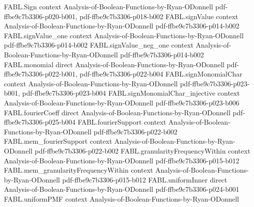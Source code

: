 \begin{theorem}
\label{FABL.FiniteFourierBasis.projectOnCoordinates_fourier_expansion}
\leanok
{}
\proofstep
  {FABL.Sign}
  {context}
  {Analysis-of-Boolean-Functions-by-Ryan-ODonnell}
  {pdf-ffbe9c7b3306-p020-b001,
    pdf-ffbe9c7b3306-p018-b002}
\proofstep
  {FABL.signValue}
  {context}
  {Analysis-of-Boolean-Functions-by-Ryan-ODonnell}
  {pdf-ffbe9c7b3306-p014-b002}
\proofstep
  {FABL.signValue_one}
  {context}
  {Analysis-of-Boolean-Functions-by-Ryan-ODonnell}
  {pdf-ffbe9c7b3306-p014-b002}
\proofstep
  {FABL.signValue_neg_one}
  {context}
  {Analysis-of-Boolean-Functions-by-Ryan-ODonnell}
  {pdf-ffbe9c7b3306-p014-b002}
\proofstep
  {FABL.monomial}
  {direct}
  {Analysis-of-Boolean-Functions-by-Ryan-ODonnell}
  {pdf-ffbe9c7b3306-p022-b001,
    pdf-ffbe9c7b3306-p022-b004}
\proofstep
  {FABL.signMonomialChar}
  {context}
  {Analysis-of-Boolean-Functions-by-Ryan-ODonnell}
  {pdf-ffbe9c7b3306-p023-b001,
    pdf-ffbe9c7b3306-p023-b004}
\proofstep
  {FABL.signMonomialChar_injective}
  {context}
  {Analysis-of-Boolean-Functions-by-Ryan-ODonnell}
  {pdf-ffbe9c7b3306-p023-b006}
\proofstep
  {FABL.fourierCoeff}
  {direct}
  {Analysis-of-Boolean-Functions-by-Ryan-ODonnell}
  {pdf-ffbe9c7b3306-p025-b004}
\proofstep
  {FABL.fourierSupport}
  {context}
  {Analysis-of-Boolean-Functions-by-Ryan-ODonnell}
  {pdf-ffbe9c7b3306-p022-b002}
\proofstep
  {FABL.mem_fourierSupport}
  {context}
  {Analysis-of-Boolean-Functions-by-Ryan-ODonnell}
  {pdf-ffbe9c7b3306-p022-b002}
\proofstep
  {FABL.granularityFrequencyWithin}
  {context}
  {Analysis-of-Boolean-Functions-by-Ryan-ODonnell}
  {pdf-ffbe9c7b3306-p015-b012}
\proofstep
  {FABL.mem_granularityFrequencyWithin}
  {context}
  {Analysis-of-Boolean-Functions-by-Ryan-ODonnell}
  {pdf-ffbe9c7b3306-p015-b012}
\proofstep
  {FABL.uniformInner}
  {direct}
  {Analysis-of-Boolean-Functions-by-Ryan-ODonnell}
  {pdf-ffbe9c7b3306-p024-b001}
\proofstep
  {FABL.uniformPMF}
  {context}
  {Analysis-of-Boolean-Functions-by-Ryan-ODonnell}

\end{theorem}
